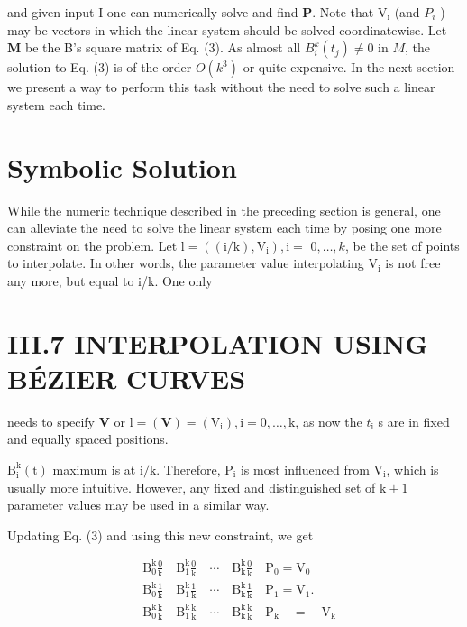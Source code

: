 and given input $\mathrm{I}$ one can numerically solve and find $\mathbf{P}$. Note that $\mathrm{V}_{\mathrm{i}}$ (and $P_{i}$ ) may be vectors in which the linear system should be solved coordinatewise. Let $\mathbf{M}$ be the B's square matrix of Eq. (3). As almost all $B_{i}^{k}\left(t_{j}\right) \neq 0$ in $M$, the solution to Eq. (3) is of the order $O\left(k^{3}\right)$ or quite expensive. In the next section we present a way to perform this task without the need to solve such a linear system each time.

\section{Symbolic Solution}
While the numeric technique described in the preceding section is general, one can alleviate the need to solve the linear system each time by posing one more constraint on the problem. Let $\mathrm{l}=\left((\mathrm{i} / \mathrm{k}), \mathrm{V}_{\mathrm{i}}\right), \mathrm{i}=$ $0, \ldots, k$, be the set of points to interpolate. In other words, the parameter value interpolating $\mathrm{V}_{\mathrm{i}}$ is not free any more, but equal to i/k. One only

\section{III.7 INTERPOLATION USING BÉZIER CURVES}
needs to specify $\mathbf{V}$ or $\mathrm{l}=(\mathbf{V})=\left(\mathrm{V}_{\mathrm{i}}\right), \mathrm{i}=0, \ldots, \mathrm{k}$, as now the $t_{\mathrm{i}}$ s are in fixed and equally spaced positions.

$\mathrm{B}_{\mathrm{i}}^{\mathrm{k}}(\mathrm{t})$ maximum is at $\mathrm{i} / \mathrm{k}$. Therefore, $\mathrm{P}_{\mathrm{i}}$ is most influenced from $\mathrm{V}_{\mathrm{i}}$, which is usually more intuitive. However, any fixed and distinguished set of $\mathrm{k}+1$ parameter values may be used in a similar way.

Updating Eq. (3) and using this new constraint, we get

$$
\begin{aligned}
& \mathrm{B}_{0}^{\mathrm{k}} \frac{0}{\mathrm{k}} \quad \mathrm{B}_{1}^{\mathrm{k}} \frac{0}{\mathrm{k}} \quad \cdots \quad \mathrm{B}_{\mathrm{k}}^{\mathrm{k}} \frac{0}{\mathrm{k}} \quad \mathrm{P}_{0}=\mathrm{V}_{0} \\
& \mathrm{B}_{0}^{\mathrm{k}} \frac{1}{\mathrm{k}} \quad \mathrm{B}_{1}^{\mathrm{k}} \frac{1}{\mathrm{k}} \quad \cdots \quad \mathrm{B}_{\mathrm{k}}^{\mathrm{k}} \frac{1}{\mathrm{k}} \quad \mathrm{P}_{1}=\mathrm{V}_{1} \text {. } \\
& \mathrm{B}_{0}^{\mathrm{k}} \frac{\mathrm{k}}{\mathrm{k}} \quad \mathrm{B}_{1}^{\mathrm{k}} \frac{\mathrm{k}}{\mathrm{k}} \quad \cdots \quad \mathrm{B}_{\mathrm{k}}^{\mathrm{k}} \frac{\mathrm{k}}{\mathrm{k}} \quad \mathrm{P}_{\mathrm{k}} \quad=\quad \mathrm{V}_{\mathrm{k}}
\end{aligned}
$$


